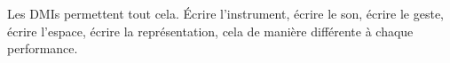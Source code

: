 






Les \glspl{DMI} permettent tout cela. Écrire l'instrument, écrire le son, écrire le geste, écrire l'espace, écrire la représentation, cela de manière différente à chaque performance. 

